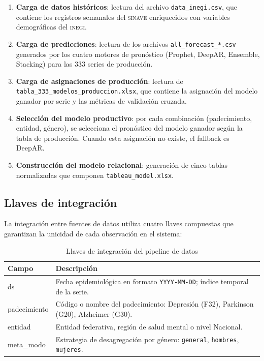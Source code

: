 \documentclass[12pt, letterpaper]{article}
\begin{document}
\begin{enumerate}[noitemsep]
    \item \textbf{Carga de datos históricos}: lectura del archivo \texttt{data\_inegi.csv}, que contiene los registros semanales del \textsc{sinave} enriquecidos con variables demográficas del \textsc{inegi}.
    \item \textbf{Carga de predicciones}: lectura de los archivos \texttt{all\_forecast\_*.csv} generados por los cuatro motores de pronóstico (Prophet, DeepAR, Ensemble, Stacking) para las 333 series de producción.
    \item \textbf{Carga de asignaciones de producción}: lectura de \texttt{tabla\_333\_modelos\_\allowbreak produccion.xlsx}, que contiene la asignación del modelo ganador por serie y las métricas de validación cruzada.
    \item \textbf{Selección del modelo productivo}: por cada combinación (padecimiento, entidad, género), se selecciona el pronóstico del modelo ganador según la tabla de producción. Cuando esta asignación no existe, el fallback es DeepAR.
    \item \textbf{Construcción del modelo relacional}: generación de cinco tablas normalizadas que componen \texttt{tableau\_model.xlsx}.
\end{enumerate}

\subsection{Llaves de integración}

La integración entre fuentes de datos utiliza cuatro llaves compuestas que garantizan la unicidad de cada observación en el sistema:

\begin{table}[H]
\centering
\caption{Llaves de integración del pipeline de datos}
\label{tab:llaves}
\small
\begin{tabularx}{\textwidth}{>{\ttfamily}l X}
\toprule
\textbf{Campo} & \textbf{Descripción} \\
\midrule
ds           & Fecha epidemiológica en formato \texttt{YYYY-MM-DD}; índice temporal de la serie. \\
padecimiento & Código o nombre del padecimiento: Depresión (F32), Parkinson (G20), Alzheimer (G30). \\
entidad      & Entidad federativa, región de salud mental o nivel Nacional. \\
meta\_modo   & Estrategia de desagregación por género: \texttt{general}, \texttt{hombres}, \texttt{mujeres}. \\
\bottomrule
\end{tabularx}
\end{table}
\end{document}

